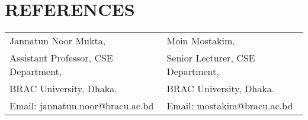 \documentclass[letterpaper,11pt]{article}
\begin{document}
\section*{\textbf{REFERENCES}}
\begin{tabular}{@{}p{} p{}}
    Jannatun Noor Mukta, & Moin Mostakim, \\
    Assistant Professor, CSE Department, & Senior Lecturer, CSE Department, \\
    BRAC University, Dhaka. & BRAC University, Dhaka. \\
    Email: jannatun.noor@bracu.ac.bd & Email: mostakim@bracu.ac.bd \\
\end{tabular}
\end{document}
